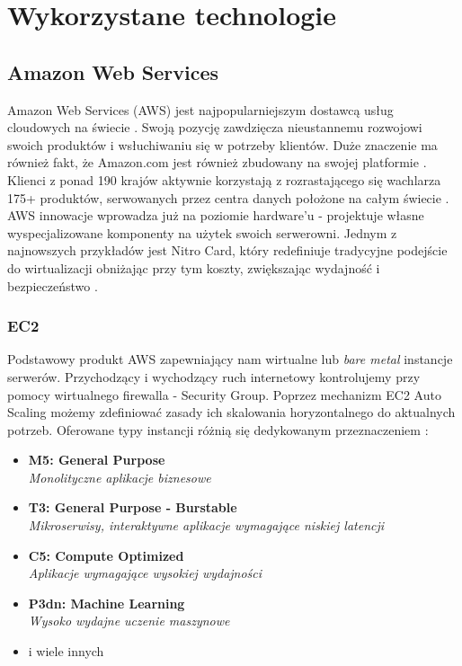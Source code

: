 \chapter{Wykorzystane technologie}
\label{cha:tech-stack}

\section{Amazon Web Services}
Amazon Web Services (AWS) jest najpopularniejszym dostawcą usług cloudowych na świecie \cite{AWS-what}. 
Swoją pozycję zawdzięcza nieustannemu rozwojowi swoich produktów i wsłuchiwaniu się w potrzeby klientów.
Duże znaczenie ma również fakt, że Amazon.com jest również zbudowany na swojej platformie \cite{AS3}.
Klienci z ponad 190 krajów aktywnie korzystają z rozrastającego się wachlarza 175+ produktów, serwowanych przez centra danych położone na całym świecie \cite{AWS-O}.
AWS innowacje wprowadza już na poziomie hardware'u - projektuje własne wyspecjalizowane komponenty na użytek swoich serwerowni.
Jednym z najnowszych przykładów jest Nitro Card, 
który redefiniuje tradycyjne podejście do wirtualizacji obniżając przy tym koszty, zwiększając wydajność i bezpieczeństwo \cite{AWS-Nitro}.

\subsection{EC2}
Podstawowy produkt AWS zapewniający nam wirtualne lub {\em bare metal} instancje serwerów. 
Przychodzący i wychodzący ruch internetowy kontrolujemy przy pomocy wirtualnego firewalla - Security Group.
Poprzez mechanizm EC2 Auto Scaling możemy zdefiniować zasady ich skalowania horyzontalnego do aktualnych potrzeb.
Oferowane typy instancji różnią się dedykowanym przeznaczeniem \cite{AWS-Nitro}:

\begin{itemize}
    \item
    \textbf{M5: General Purpose}\\
    {\em Monolityczne aplikacje biznesowe}
    
    \item
    \textbf{T3: General Purpose - Burstable}\\
    {\em Mikroserwisy, interaktywne aplikacje wymagające niskiej latencji}

    \item
    \textbf{C5: Compute Optimized}\\
    {\em Aplikacje wymagające wysokiej wydajności}

    \item
    \textbf{P3dn: Machine Learning}\\
    {\em Wysoko wydajne uczenie maszynowe}

    \item
    i wiele innych
\end{itemize} 

